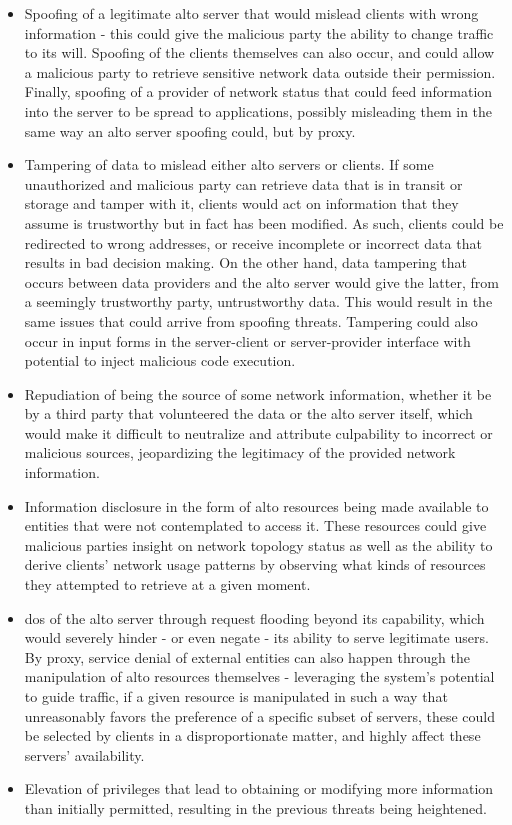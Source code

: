 \begin{itemize}
    \item Spoofing of a legitimate \gls{alto} server that would mislead clients with wrong information - this could give the malicious party the ability to change traffic to its will.
        Spoofing of the clients themselves can also occur, and could allow a malicious party to retrieve sensitive network data outside their permission.
        Finally, spoofing of a provider of network status that could feed information into the server to be spread to applications, possibly misleading them in the same way an \gls{alto} server spoofing could, but by proxy.
    \item Tampering of data to mislead either \gls{alto} servers or clients.
        If some unauthorized and malicious party can retrieve data that is in transit or storage and tamper with it, clients would act on information that they assume is trustworthy but in fact has been modified.
        As such, clients could be redirected to wrong addresses, or receive incomplete or incorrect data that results in bad decision making.
        On the other hand, data tampering that occurs between data providers and the \gls{alto} server would give the latter, from a seemingly trustworthy party, untrustworthy data.
        This would result in the same issues that could arrive from spoofing threats.
        Tampering could also occur in input forms in the server-client or server-provider interface with potential to inject malicious code execution.
    \item Repudiation of being the source of some network information, whether it be by a third party that volunteered the data or the \gls{alto} server itself, which would make it difficult to neutralize and attribute culpability to incorrect or malicious sources, jeopardizing the legitimacy of the provided network information.
    \item Information disclosure in the form of \gls{alto} resources being made available to entities that were not contemplated to access it.
            These resources could give malicious parties insight on network topology status as well as the ability to derive clients' network usage patterns by observing what kinds of resources they attempted to retrieve at a given moment.
    \item \gls{dos} of the \gls{alto} server through request flooding beyond its capability, which would severely hinder - or even negate - its ability to serve legitimate users.
        By proxy, service denial of external entities can also happen through the manipulation of \gls{alto} resources themselves - leveraging the system's potential to guide traffic, if a given resource is manipulated in such a way that unreasonably favors the preference of a specific subset of servers, these could be selected by clients in a disproportionate matter, and highly affect these servers' availability.
    \item Elevation of privileges that lead to obtaining or modifying more information than initially permitted, resulting in the previous threats being heightened.
\end{itemize}

